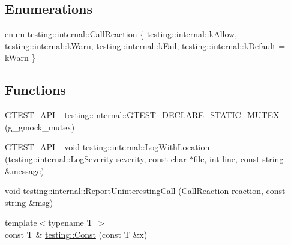 \subsection*{Enumerations}
\begin{DoxyCompactItemize}
\item 
enum \hyperlink{namespacetesting_1_1internal_adfcd859062983a889f4bd18e6977357e}{testing\+::internal\+::\+Call\+Reaction} \{ \hyperlink{namespacetesting_1_1internal_adfcd859062983a889f4bd18e6977357ea8fb8a836a31364701cd5c07daa8638cb}{testing\+::internal\+::k\+Allow}, 
\hyperlink{namespacetesting_1_1internal_adfcd859062983a889f4bd18e6977357ead61a9c681c751967e19f7abe4640d4a2}{testing\+::internal\+::k\+Warn}, 
\hyperlink{namespacetesting_1_1internal_adfcd859062983a889f4bd18e6977357ea6fc25174a501f31b090a2b556f77fdc1}{testing\+::internal\+::k\+Fail}, 
\hyperlink{namespacetesting_1_1internal_adfcd859062983a889f4bd18e6977357ea8ff660434ddb710d1d588df98ee902fc}{testing\+::internal\+::k\+Default} = k\+Warn
 \}
\end{DoxyCompactItemize}
\subsection*{Functions}
\begin{DoxyCompactItemize}
\item 
\hyperlink{gtest-port_8h_aa73be6f0ba4a7456180a94904ce17790}{G\+T\+E\+S\+T\+\_\+\+A\+P\+I\+\_\+} \hyperlink{namespacetesting_1_1internal_ae4d273e9b76b40a28483826518e68f17}{testing\+::internal\+::\+G\+T\+E\+S\+T\+\_\+\+D\+E\+C\+L\+A\+R\+E\+\_\+\+S\+T\+A\+T\+I\+C\+\_\+\+M\+U\+T\+E\+X\+\_\+} (g\+\_\+gmock\+\_\+mutex)
\item 
\hyperlink{gtest-port_8h_aa73be6f0ba4a7456180a94904ce17790}{G\+T\+E\+S\+T\+\_\+\+A\+P\+I\+\_\+} void \hyperlink{namespacetesting_1_1internal_af271cd1fc0b62a7f4736cb3109e86a37}{testing\+::internal\+::\+Log\+With\+Location} (\hyperlink{namespacetesting_1_1internal_a203d1a8a2147a53d12bbdae40d443914}{testing\+::internal\+::\+Log\+Severity} severity, const char $\ast$file, int line, const string \&message)
\item 
void \hyperlink{namespacetesting_1_1internal_a8d99a1e87d0cea563b2bfad8a4e65276}{testing\+::internal\+::\+Report\+Uninteresting\+Call} (Call\+Reaction reaction, const string \&msg)
\item 
{\footnotesize template$<$typename T $>$ }\\const T \& \hyperlink{namespacetesting_a945ac56c5508a3c9c032bbe8aae8dcfa}{testing\+::\+Const} (const T \&x)
\end{DoxyCompactItemize}
